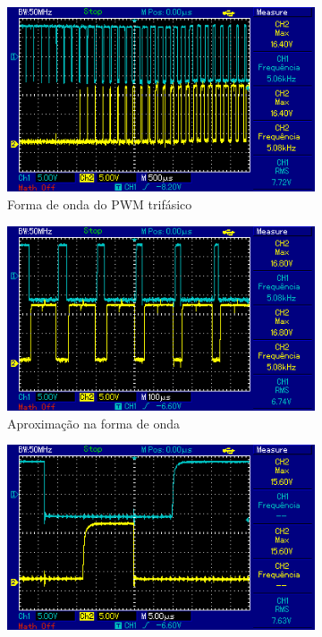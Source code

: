 \begin{figure}[!hbt]
	\centering
	\begin{subfigure}[b]{0.49\textwidth}
		\centering
		\includegraphics[width=\textwidth]{figuras/resultados_pwm1_1.png}
		\caption{Forma de onda do PWM trifásico}
	\end{subfigure}
	\begin{subfigure}[b]{0.49\textwidth}
		\centering
		\includegraphics[width=\textwidth]{figuras/resultados_pwm2_1.png}
		\caption{Aproximação na forma de onda}
	\end{subfigure}
	\begin{subfigure}[b]{0.49\textwidth}
		\centering
		\includegraphics[width=\textwidth]{figuras/resultados_tempo_morto1.png}

\end{subfigure}
\end{figure}
